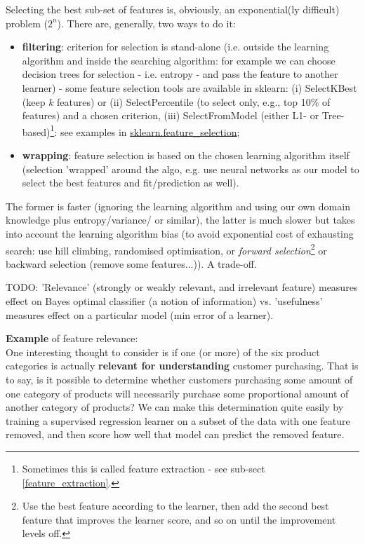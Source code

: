 \documentclass[11pt]{article}
\begin{document}
Selecting the best sub-set of features is, obviously, an exponential(ly difficult) problem ($2^n$). There are, generally, two ways to do it:
\begin{itemize}
	\item \textbf{filtering}: criterion for selection is stand-alone (i.e. outside the learning algorithm and inside the searching algorithm: for example we can choose decision trees for selection - i.e. entropy - and pass the feature to another learner) - some feature selection tools are available in sklearn: (i) SelectKBest (keep $k$ features) or (ii) SelectPercentile (to select only, e.g., top 10\% of features) and a chosen criterion, (iii) SelectFromModel (either L1- or Tree-based)\footnote{Sometimes this is called feature extraction - see sub-sect \ref{feature_extraction}.}: see examples in \href{http://scikit-learn.org/stable/modules/feature_selection.html}{sklearn.feature\_selection};
	\item \textbf{wrapping}: feature selection is based on the chosen learning algorithm itself (selection 'wrapped' around the algo, e.g. use neural networks as our model to select the best features and fit/prediction as well). 
\end{itemize}

The former is faster (ignoring the learning algorithm and using our own domain knowledge plus entropy/variance/ or similar), the latter is much slower but takes into account the learning algorithm bias (to avoid exponential cost of exhausting search: use hill climbing, randomised optimisation, or \textit{forward selection}\footnote{Use the best feature according to the learner, then add the second best feature that improves the learner score, and so on until the improvement levels off.} or backward selection (remove some features...)). A trade-off.

TODO: 'Relevance' (strongly or weakly relevant, and irrelevant feature) measures effect on Bayes optimal classifier (a notion of information) vs. 'usefulness' measures effect on a particular model (min error of a learner).

\textbf{Example} of feature relevance: \\
{\small One interesting thought to consider is if one (or more) of the six product categories is actually \textbf{relevant for understanding} customer purchasing. That is to say, is it possible to determine whether customers purchasing some amount of one category of products will necessarily purchase some proportional amount of another category of products? We can make this determination quite easily by training a supervised regression learner on a subset of the data with one feature removed, and then score how well that model can predict the removed feature.}
\end{document}
